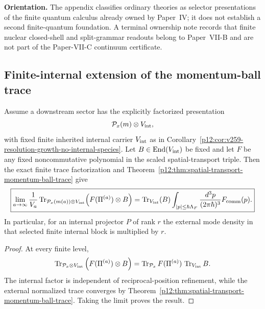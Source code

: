 \documentclass[12pt,a4paper]{article}
\begin{document}
\noindent\textbf{Orientation.}
The appendix classifies ordinary theories as selector presentations of the finite quantum calculus already owned by Paper~IV; it does not establish a second finite-quantum foundation.  A terminal ownership note records that finite nuclear closed-shell and split-grammar readouts belong to Paper~VII-B and are not part of the Paper-VII-C continuum certificate.


\subsection{Finite-internal extension of the momentum-ball trace}
\label{p12:app:v2102-finite-internal-momentum-trace}

\begin{corollary}
\label{p12:cor:v2102-finite-internal-momentum-trace}
Assume a downstream sector has the explicitly factorized presentation
\[
 \mathcal P_x(m)\otimes V_{\rm int},
\]
with fixed finite inherited internal carrier $V_{\rm int}$ as in
Corollary~\ref{p12:cor:v259-resolution-growth-no-internal-species}.  Let
$B\in\operatorname{End}(V_{\rm int})$ be fixed and let $F$ be any fixed noncommutative
polynomial in the scaled spatial-transport triple.  Then the exact finite trace
factorization and Theorem~\ref{p12:thm:spatial-transport-momentum-ball-trace}
give
\[
 \boxed{
 \lim_{a\to\infty}\frac1{V_a}
 \operatorname{Tr}_{\mathcal P_x(m(a))\otimes V_{\rm int}}
 \!\left(F(\Pi^{(a)})\otimes B\right)
 =\operatorname{Tr}_{V_{\rm int}}(B)
 \int_{|p|\le\hbar\Lambda_F}
 \frac{d^3p}{(2\pi\hbar)^3}F_{\rm comm}(p).}
\]
In particular, for an internal projector $P$ of rank $r$ the external mode
density in that selected finite internal block is multiplied by $r$.
\end{corollary}

\begin{proof}
At every finite level,
\[
 \operatorname{Tr}_{\mathcal P_x\otimes V_{\rm int}}
 \left(F(\Pi^{(a)})\otimes B\right)
 =\operatorname{Tr}_{\mathcal P_x}F(\Pi^{(a)})\,
  \operatorname{Tr}_{V_{\rm int}}B.
\]
The internal factor is independent of reciprocal-position refinement, while
the external normalized trace converges by
Theorem~\ref{p12:thm:spatial-transport-momentum-ball-trace}.  Taking the limit
proves the result.
\end{proof}
\end{document}
